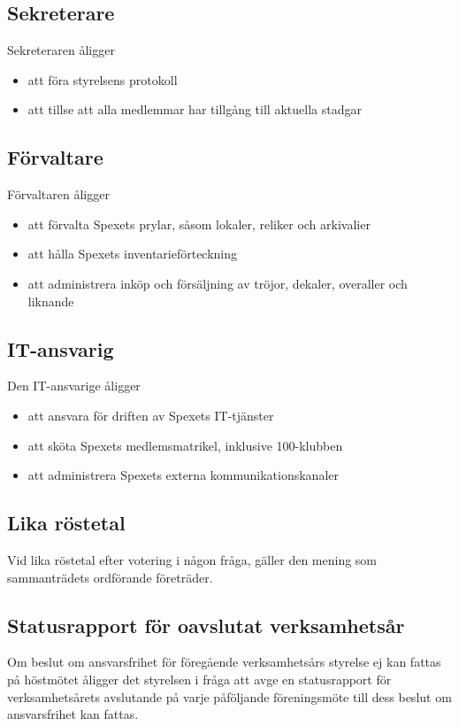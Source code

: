 \documentclass[a4paper]{article}
\begin{document}
\subsection{Sekreterare}
Sekreteraren åligger

\begin{itemize}
  \item att föra styrelsens protokoll
  \item att tillse att alla medlemmar har tillgång till aktuella stadgar
\end{itemize}

\subsection{Förvaltare}
Förvaltaren åligger

\begin{itemize}
  \item att förvalta Spexets prylar, såsom lokaler, reliker och arkivalier
  \item att hålla Spexets inventarieförteckning
  \item att administrera inköp och försäljning av tröjor, dekaler, overaller och liknande
\end{itemize}

\subsection{IT-ansvarig}
Den IT-ansvarige åligger

\begin{itemize}
  \item att ansvara för driften av Spexets IT-tjänster
  \item att sköta Spexets medlemsmatrikel, inklusive 100-klubben
  \item att administrera Spexets externa kommunikationskanaler
\end{itemize}

\subsection{Lika röstetal}
Vid lika röstetal efter votering i någon fråga, gäller den mening som sammanträdets ordförande företräder.

\subsection{Statusrapport för oavslutat verksamhetsår}
Om beslut om ansvarsfrihet för föregående verksamhetsårs styrelse ej kan fattas på höstmötet åligger det styrelsen i fråga att avge en statusrapport för verksamhetsårets avslutande på varje påföljande föreningsmöte till dess beslut om ansvarsfrihet kan fattas.
\end{document}
